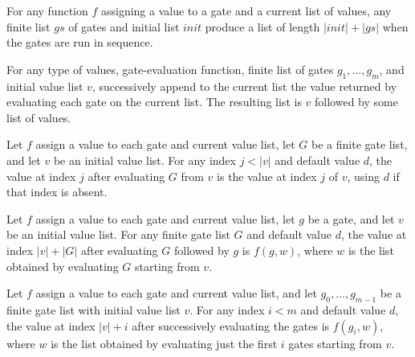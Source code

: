 \begin{theorem}
\label{BoolCircuit.length_runWith}
\leanok
{}
For any function $f$ assigning a value to a gate and a current list of values, any
finite list $gs$ of gates and initial list $init$ produce a list of length $|init|+|gs|$
when the gates are run in sequence.
\end{theorem}

\begin{theorem}
\label{BoolCircuit.runWith_eq_append}
\leanok
{}
For any type of values, gate-evaluation function, finite list of gates $g_1,\ldots,g_m$,
and initial value list $v$, successively append to the current list the value returned
by evaluating each gate on the current list. The resulting list is $v$ followed by some
list of values.
\end{theorem}

\begin{theorem}
\label{BoolCircuit.runWith_getD_of_lt}
\leanok
{}
Let $f$ assign a value to each gate and current value list, let $G$ be a finite gate
list, and let $v$ be an initial value list. For any index $j<|v|$ and default value $d$,
the value at index $j$ after evaluating $G$ from $v$ is the value at index $j$ of $v$,
using $d$ if that index is absent.
\end{theorem}

\begin{theorem}
\label{BoolCircuit.runWith_getD_last}
\leanok
{}
Let $f$ assign a value to each gate and current value list, let $g$ be a gate, and let
$v$ be an initial value list. For any finite gate list $G$ and default value $d$, the
value at index $|v|+|G|$ after evaluating $G$ followed by $g$ is $f(g,w)$, where $w$ is
the list obtained by evaluating $G$ starting from $v$.
\end{theorem}

\begin{theorem}
\label{BoolCircuit.runWith_getD_gate}
\leanok
{}
Let $f$ assign a value to each gate and current value list, and let $g_0,\ldots,g_{m-1}$
be a finite gate list with initial value list $v$. For any index $i<m$ and default value
$d$, the value at index $|v|+i$ after successively evaluating the gates is $f(g_i, w)$,
where $w$ is the list obtained by evaluating just the first $i$ gates starting from $v$.
\end{theorem}

